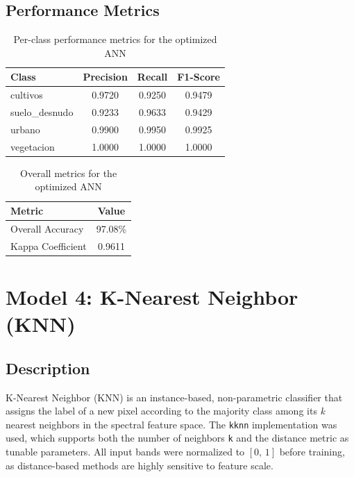 \documentclass[12pt,a4paper]{article}
\begin{document}
\subsection{Performance Metrics}

\begin{table}[H]
\centering
\begin{tabular}{|m{4cm}|c|c|c|}
\hline
\textbf{Class} & \textbf{Precision} & \textbf{Recall} & \textbf{F1-Score} \\
\hline
cultivos       & 0.9720 & 0.9250 & 0.9479 \\
\hline
suelo\_desnudo & 0.9233 & 0.9633 & 0.9429 \\
\hline
urbano         & 0.9900 & 0.9950 & 0.9925 \\
\hline
vegetacion     & 1.0000 & 1.0000 & 1.0000 \\
\hline
\end{tabular}
\caption{Per-class performance metrics for the optimized ANN}
\end{table}

\begin{table}[H]
\centering
\begin{tabular}{|m{5cm}|c|}
\hline
\textbf{Metric} & \textbf{Value} \\
\hline
Overall Accuracy  & 97.08\% \\
\hline
Kappa Coefficient & 0.9611 \\
\hline
\end{tabular}
\caption{Overall metrics for the optimized ANN}
\end{table}

\section{Model 4: K-Nearest Neighbor (KNN)}

\subsection{Description}

K-Nearest Neighbor (KNN) is an instance-based, non-parametric classifier that assigns the label of a new pixel according to the majority class among its \textit{k} nearest neighbors in the spectral feature space. The \texttt{kknn} implementation was used, which supports both the number of neighbors \texttt{k} and the distance metric as tunable parameters. All input bands were normalized to $[0,\,1]$ before training, as distance-based methods are highly sensitive to feature scale.
\end{document}
